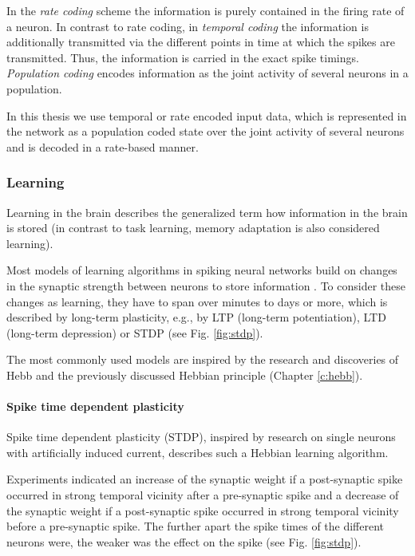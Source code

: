 In the \textit{rate coding} scheme the information is purely contained in the firing rate of a neuron.
In contrast to rate coding, in \textit{temporal coding} the information is additionally transmitted via the different points in time at which the spikes are transmitted. 
Thus, the information is carried in the exact spike timings.
\textit{Population coding} encodes information as the joint activity of several neurons in a population.  

In this thesis we use temporal or rate encoded input data, which is represented in the network as a population coded state over the joint activity of several neurons and is decoded in a rate-based manner. 

\subsubsection{Learning} \label{c:snnlearning}

Learning in the brain describes the generalized term how information in the brain is stored (in contrast to task learning, memory adaptation is also considered learning).

Most models of learning algorithms in spiking neural networks build on changes in the synaptic strength between neurons to store information \cite{gerstner2014neuronal}.
To consider these changes as learning, they have to span over minutes to days or more, which is described by long-term plasticity, e.g., by LTP (long-term potentiation), LTD (long-term depression) or STDP (see Fig. \ref{fig:stdp}).
 
The most commonly used models are inspired by the research and discoveries of Hebb and the previously discussed Hebbian principle (Chapter \ref{c:hebb}).

\paragraph{Spike time dependent plasticity} \label{c:stdp}

Spike time dependent plasticity (STDP), inspired by research on single neurons with artificially induced current, describes such a Hebbian learning algorithm.

Experiments indicated an increase of the synaptic weight if a post-synaptic spike occurred in strong temporal vicinity after a pre-synaptic spike and a decrease of the synaptic weight if a post-synaptic spike occurred in strong temporal vicinity before a pre-synaptic spike.
The further apart the spike times of the different neurons were, the weaker was the effect on the spike (see Fig. \ref{fig:stdp}).

